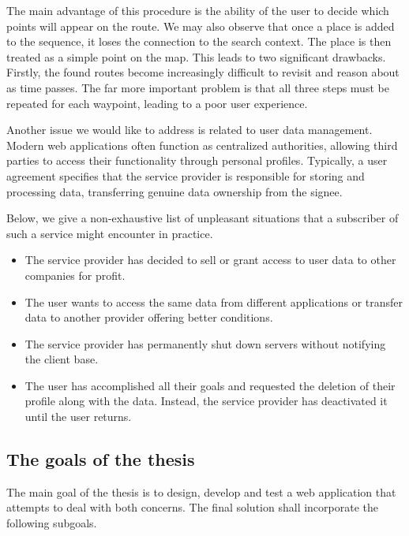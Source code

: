 The main advantage of this procedure is the ability of the user to decide which points will appear on the route. We may also observe that once a place is added to the sequence, it loses the connection to the search context. The place is then treated as a simple point on the map. This leads to two significant drawbacks. Firstly, the found routes become increasingly difficult to revisit and reason about as time passes. The far more important problem is that all three steps must be repeated for each waypoint, leading to a poor user experience.

\vspace{0.5em}

Another issue we would like to address is related to user data management. Modern web applications often function as centralized authorities, allowing third parties to access their functionality through personal profiles. Typically, a user agreement specifies that the service provider is responsible for storing and processing data, transferring genuine data ownership from the signee.

Below, we give a non-exhaustive list of unpleasant situations that a subscriber of such a service might encounter in practice.

\begin{itemize}
\item The service provider has decided to sell or grant access to user data to other companies for profit.
\item The user wants to access the same data from different applications or transfer data to another provider offering better conditions.
\item The service provider has permanently shut down servers without notifying the client base.
\item The user has accomplished all their goals and requested the deletion of their profile along with the data. Instead, the service provider has deactivated it until the user returns.
\end{itemize}

\subsection*{The goals of the thesis}

The main goal of the thesis is to design, develop and test a web application that attempts to deal with both concerns. The final solution shall incorporate the following subgoals.

